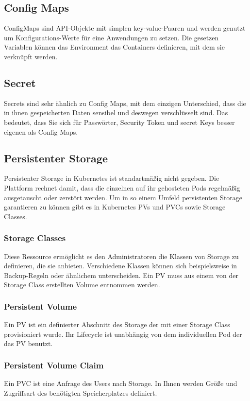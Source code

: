 \subsection{Config Maps}
ConfigMaps sind \ac{API}-Objekte mit simplen key-value-Paaren und werden genutzt um Konfigurations-Werte für eine Anwendungen zu setzen. 
Die gesetzen Variablen können das Environment das Containers definieren, mit dem sie verknüpft werden.
\cite[S.153]{Kubernetes_up_and_running}

\subsection{Secret}
Secrets sind sehr ähnlich zu Config Maps, mit dem einzigen Unterschied, dass die in ihnen gespeicherten Daten sensibel und deswegen verschlüsselt sind.
Das bedeutet, dass Sie sich für Passwörter, Security Token und secret Keys besser eigenen als Config Maps.
\cite[S.157 f.]{Kubernetes_up_and_running}

\subsection{Persistenter Storage}
Persistenter Storage in Kubernetes ist standartmäßig nicht gegeben. 
Die Plattform rechnet damit, dass die einzelnen auf ihr gehosteten Pods regelmäßig ausgetauscht oder zerstört werden. 
Um in so einem Umfeld persistenten Storage garantieren zu können gibt es in Kubernetes \ac{PV}s und \ac{PVC}s sowie Storage Classes.

\subsubsection{Storage Classes}
Diese Ressource ermöglicht es den Administratoren die Klassen von Storage zu definieren, die sie anbieten.
Verschiedene Klassen können sich beispielsweise in Backup-Regeln oder ähnlichem unterscheiden.   
Ein \ac{PV} muss aus einem von der Storage Class erstellten Volume entnommen werden.

\subsubsection{Persistent Volume}
Ein \ac{PV} ist ein definierter Abschnitt des Storage der mit einer Storage Class provisioniert wurde.
Ihr Lifecycle ist unabhängig von dem individuellen Pod der das \ac{PV} benutzt.

\subsubsection{Persistent Volume Claim}
Ein \ac{PVC} ist eine Anfrage des Users nach Storage.
In Ihnen werden Größe und Zugriffsart des benötigten Speicherplatzes definiert. 

